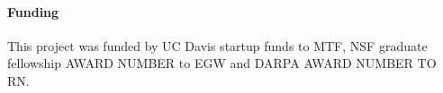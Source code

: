 \documentclass{bioinfo}
\begin{document}
\paragraph{Funding\textcolon} 

This project was funded by UC Davis startup funds to MTF, NSF graduate
fellowship AWARD NUMBER to EGW and DARPA AWARD NUMBER TO RN.

%
%
%
%
%




\end{document}
